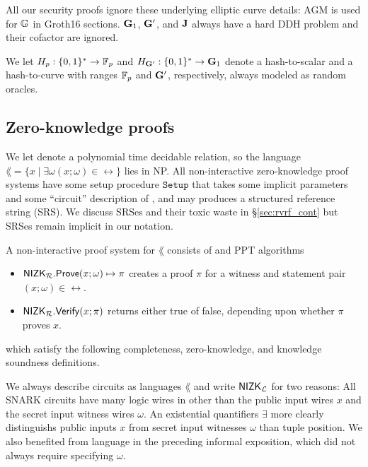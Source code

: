 All our security proofs ignore these underlying elliptic curve details:
AGM is used for ${\mathbb{G}}$ in Groth16 sections. 
${\mathbf{G}}_1$, ${\mathbf{G}}'$, and ${\mathbf{J}}$ always have a hard DDH problem
 and their cofactor are ignored.

We let $H_p : \{0,1\}^* \to \mathbb{F}_p$ and $H_{{\mathbf{G}}'} : \{0,1\}^* \to {\mathbf{G}}_1$
denote a hash-to-scalar and a hash-to-curve  with ranges
$\mathbb{F}_p$ and ${\mathbf{G}}'$, respectively, always modeled as random oracles.  


\subsection{Zero-knowledge proofs}
\label{subsec:zkp_background}

% 

We let \rel denote a polynomial time decidable relation, so the language
$\lang = \{x \mid \exists \omega (x; \omega) \in \rel \}$ lies in NP.
All non-interactive zero-knowledge proof systems have some setup procedure
$\mathtt{Setup}$ that takes some implicit parameters and some ``circuit''
description of \rel, and may produces a structured reference string (SRS).
We discuss SRSes and their toxic waste in \S\ref{sec:rvrf_cont} but
SRSes remain implicit in our notation.

A non-interactive proof system for $\lang$ consists of \Prove and \Verify PPT algorithms
\begin{itemize}
\item ${\mathsf{NIZK}}_\mathcal{R}.{\mathsf{Prove}}(x; \omega) \mapsto \pi$ creates a proof $\pi$ for a witness and statement pair $(x; \omega) \in \rel$.
\item ${\mathsf{NIZK}}_\mathcal{R}.{\mathsf{Verify}}(x; \pi)$ returns either true of false, depending upon whether $\pi$  proves $x$.
\end{itemize}	
which satisfy the following completeness, zero-knowledge, and knowledge soundness definitions.

We always describe circuits as languages $\lang$ and write ${\mathsf{NIZK}}_\mathcal{L}$ for two reasons: 
All SNARK circuits have many logic wires in \rel other than
the public input wires $x$ and the secret input witness wires $\omega$.
An existential quantifiers $\exists$ more clearly distinguishs
public inputs $x$ from secret input witnesses $\omega$ than tuple position.
We also benefited from language in the preceding informal exposition,
 which did not always require specifying $\omega$.

